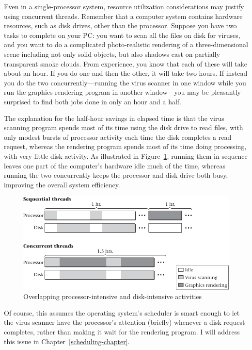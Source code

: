 Even in a single-processor system, resource utilization considerations
may justify using concurrent threads.  Remember that a computer
system contains hardware resources, such as
disk drives, other than the processor. Suppose you have two tasks to complete on your PC: you
want to scan all the files on disk for viruses, and you want to do a
complicated photo-realistic rendering of a three-dimensional scene
including not only solid objects, but also shadows cast on
partially transparent smoke clouds.  From experience, you know
that each of these will take about an hour.  If you do one and then
the other, it will take two hours.  If instead you do the two
concurrently---running the virus scanner in one window while you run
the graphics rendering program in another window---you may be
pleasantly surprised to find both jobs done in only an hour and a half.

The explanation for the half-hour savings in elapsed time is that the virus scanning program spends most
of its time using the disk drive to read files, with only modest
bursts of processor activity each time the disk completes a read
request, whereas the rendering program spends most of its time doing
processing, with very little disk activity.  As illustrated in Figure~\ref{scan-2-4}, running them in
sequence leaves one part of the computer's hardware idle much of the time,
whereas running the two concurrently keeps the processor and disk
drive both busy, improving the overall system efficiency.
\begin{figure}
\centerline{\includegraphics{hail_f0206}}
\caption{Overlapping processor-intensive and disk-intensive activities}
\label{scan-2-4}
\end{figure}
Of course,
this assumes the operating system's scheduler is smart enough to let
the virus scanner have the processor's attention (briefly) whenever a
disk request completes, rather than making it wait for the rendering
program.  I will address this issue in Chapter~\ref{scheduling-chapter}.

